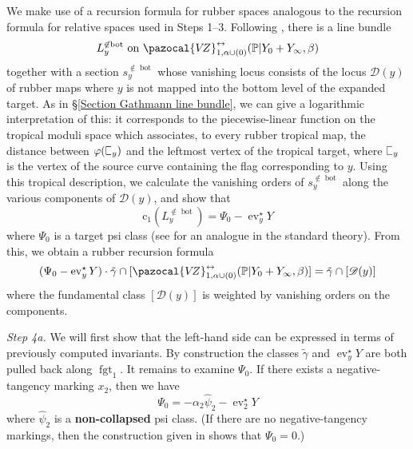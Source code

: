 \documentclass[11pt]{amsart}
\newcommand{\sqC}{\scalebox{0.8}[1.3]{$\sqsubset$}}
\newcommand{\VZ}{\pazocal{V\!Z}}
\newcommand{\st}{\star}
\newcommand{\ev}{\operatorname{ev}}
\newcommand{\fgt}{\operatorname{fgt}}
\newcommand{\Dcal}{\mathcal{D}}
\newcommand{\cchern}{\mathrm{c}}
\theoremstyle{definition}
\theoremstyle{definition}
\begin{document}
We make use of a recursion formula for rubber spaces analogous to the recursion formula for relative spaces used in Steps 1--3. Following \cite{EKatz}, there is a line bundle
\begin{equation*} L_y^{\not\in \operatorname{bot}} \text{ on } \VZ^{\leftrightarrow}_{1,\alpha\cup (0)}(\mathbb P|Y_0+Y_\infty,\beta)\end{equation*}
together with a section $s_y^{\not\in\operatorname{bot}}$ whose vanishing locus consists of the locus $\Dcal(y)$ of rubber maps where $y$ is not mapped into the bottom level of the expanded target. As in \S \ref{Section Gathmann line bundle}, we can give a logarithmic interpretation of this: it corresponds to the piecewise-linear function on the tropical moduli space which associates, to every rubber tropical map, the distance between $\varphi(\sqC_y)$ and the leftmost vertex of the tropical target, where $\sqC_y$ is the vertex of the source curve containing the flag corresponding to $y$. Using this tropical description, we calculate the vanishing orders of $s_y^{\not\in\operatorname{bot}}$ along the various components of $\Dcal(y)$, and show that
\begin{equation*}\cchern_1(L_y^{\not\in\operatorname{bot}}) = \Psi_0 - \ev_y^\st Y\end{equation*}
where $\Psi_0$ is a target psi class (see \cite{EKatzLB} for an analogue in the standard theory). From this, we obtain a rubber recursion formula
\begin{equation}\label{step 4 recursion} (\Psi_0 - \ev_y^\st Y)\cdot \tilde\gamma \cap [\VZ^{\leftrightarrow}_{1,\alpha\cup(0)}(\mathbb P|Y_0+Y_\infty,\beta)] = \tilde\gamma \cap [\Dcal(y)]\end{equation}
where the fundamental class $[\Dcal(y)]$ is weighted by vanishing orders on the components.\medskip

\noindent \emph{Step 4a.} We will first show that the left-hand side can be expressed in terms of previously computed invariants. By construction the classes $\tilde\gamma$ and $\ev_y^\star Y$ are both pulled back along $\fgt_{1}$. It remains to examine $\Psi_0$. If there exists a negative-tangency marking $x_2$, then we have \cite[Construction 5.1.17]{GathmannThesis}
\begin{equation*}\label{Psi0 formula} \Psi_0 = -\alpha_2 \hat\psi_2 - \ev_2^\st Y \end{equation*}
where $\hat\psi_2$ is a \textbf{non-collapsed} psi class. (If there are no negative-tangency markings, then the construction given in \cite[\S 1.5.2]{MaulikPandharipande} shows that $\Psi_0=0$.)
\end{document}
